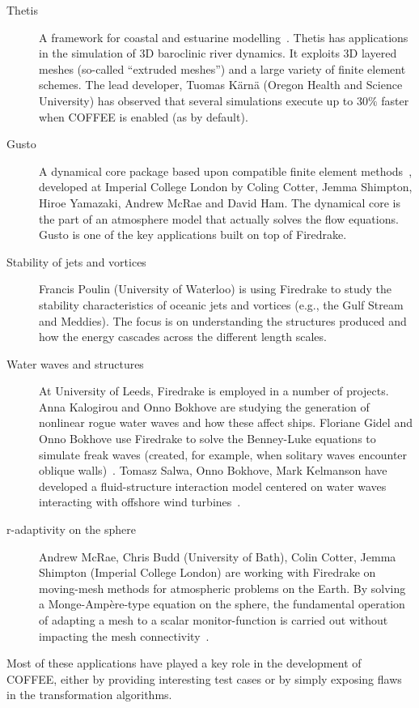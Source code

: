 \begin{description}
\item[Thetis] A framework for coastal and estuarine modelling~\citep{thetis-webpage}. Thetis has applications in the simulation of 3D baroclinic river dynamics. It exploits 3D layered meshes (so-called ``extruded meshes'') and a large variety of finite element schemes. The lead developer, Tuomas K{\"a}rn{\"a} (Oregon Health and Science University) has observed that several simulations execute up to 30$\%$ faster when COFFEE is enabled (as by default).
\item[Gusto] A dynamical core package based upon compatible finite element methods~\citep{gusto-webpage}, developed at Imperial College London by Coling Cotter, Jemma Shimpton, Hiroe Yamazaki, Andrew McRae and David Ham. The dynamical core is the part of an atmosphere model that actually solves the flow equations. Gusto is one of the key applications built on top of Firedrake.
\item[Stability of jets and vortices] Francis Poulin (University of Waterloo) is using Firedrake to study the stability characteristics of oceanic jets and vortices (e.g., the Gulf Stream and Meddies). The focus is on understanding the structures produced and how the energy cascades across the different length scales.
\item[Water waves and structures] At University of Leeds, Firedrake is employed in a number of projects. Anna Kalogirou and Onno Bokhove are studying the generation of nonlinear rogue water waves and how these affect ships. Floriane Gidel and Onno Bokhove use Firedrake to solve the Benney-Luke equations to simulate freak waves (created, for example, when solitary waves encounter oblique walls)~\citep{gidel-bokhove}. Tomasz Salwa, Onno Bokhove, Mark Kelmanson have developed a fluid-structure interaction model centered on water waves interacting with offshore wind turbines~\citep{salwa-bokhove-kelmanson}.
\item[r-adaptivity on the sphere] Andrew McRae, Chris Budd (University of Bath), Colin Cotter, Jemma Shimpton (Imperial College London) are working with Firedrake on moving-mesh methods for atmospheric problems on the Earth. By solving a Monge-Ampère-type equation on the sphere, the fundamental operation of adapting a mesh to a scalar monitor-function is carried out without impacting the mesh connectivity~\citep{r-adaptivity}.
\end{description}

Most of these applications have played a key role in the development of COFFEE, either by providing interesting test cases or by simply exposing flaws in the transformation algorithms.